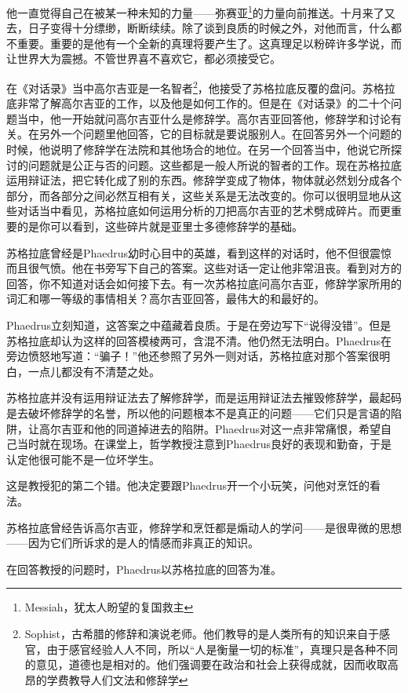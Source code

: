 \documentclass[UTF8]{article}
\begin{document}
\par 他一直觉得自己在被某一种未知的力量——弥赛亚\footnote{Messiah，犹太人盼望的复国救主}的力量向前推送。十月来了又去，日子变得十分缥缈，断断续续。除了谈到良质的时候之外，对他而言，什么都不重要。重要的是他有一个全新的真理将要产生了。这真理足以粉碎许多学说，而让世界大为震撼。不管世界喜不喜欢它，都必须接受它。
\par 在《对话录》当中高尔吉亚是一名智者\footnote{Sophist，古希腊的修辞和演说老师。他们教导的是人类所有的知识来自于感官，由于感官经验人人不同，所以“人是衡量一切的标准”，真理只是各种不同的意见，道德也是相对的。他们强调要在政治和社会上获得成就，因而收取高昂的学费教导人们文法和修辞学}，他接受了苏格拉底反覆的盘问。苏格拉底非常了解高尔吉亚的工作，以及他是如何工作的。但是在《对话录》的二十个问题当中，他一开始就问高尔吉亚什么是修辞学。高尔吉亚回答他，修辞学和讨论有关。在另外一个问题里他回答，它的目标就是要说服别人。在回答另外一个问题的时候，他说明了修辞学在法院和其他场合的地位。在另一个回答当中，他说它所探讨的问题就是公正与否的问题。这些都是一般人所说的智者的工作。现在苏格拉底运用辩证法，把它转化成了别的东西。修辞学变成了物体，物体就必然划分成各个部分，而各部分之间必然互相有关，这些关系是无法改变的。你可以很明显地从这些对话当中看见，苏格拉底如何运用分析的刀把高尔吉亚的艺术劈成碎片。而更重要的是你可以看到，这些碎片就是亚里士多德修辞学的基础。
\par 苏格拉底曾经是Phaedrus幼时心目中的英雄，看到这样的对话时，他不但很震惊而且很气愤。他在书旁写下自己的答案。这些对话一定让他非常沮丧。看到对方的回答，你不知道对话会如何接下去。有一次苏格拉底问高尔吉亚，修辞学家所用的词汇和哪一等级的事情相关？高尔吉亚回答，最伟大的和最好的。
\par Phaedrus立刻知道，这答案之中蕴藏着良质。于是在旁边写下“说得没错”。但是苏格拉底却认为这样的回答模棱两可，含混不清。他仍然无法明白。Phaedrus在旁边愤怒地写道：“骗子！”他还参照了另外一则对话，苏格拉底对那个答案很明白，一点儿都没有不清楚之处。
\par 苏格拉底并没有运用辩证法去了解修辞学，而是运用辩证法去摧毁修辞学，最起码是去破坏修辞学的名誉，所以他的问题根本不是真正的问题——它们只是言语的陷阱，让高尔吉亚和他的同道掉进去的陷阱。Phaedrus对这一点非常痛恨，希望自己当时就在现场。在课堂上，哲学教授注意到Phaedrus良好的表现和勤奋，于是认定他很可能不是一位坏学生。
\par 这是教授犯的第二个错。他决定要跟Phaedrus开一个小玩笑，问他对烹饪的看法。
\par 苏格拉底曾经告诉高尔吉亚，修辞学和烹饪都是煽动人的学问——是很卑微的思想——因为它们所诉求的是人的情感而非真正的知识。
\par 在回答教授的问题时，Phaedrus以苏格拉底的回答为准。
\end{document}
